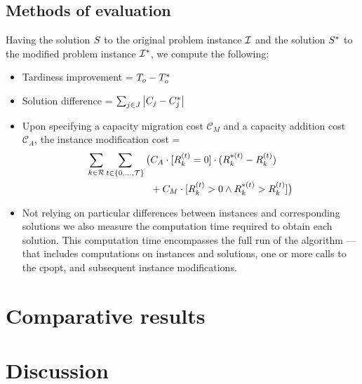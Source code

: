 \subsection{Methods of evaluation} \label{subsec:numerical-experiments/setup/methods-of-evaluation}

Having the solution $S$ to the original problem instance $\mathcal{I}$
and the solution $S^*$ to the modified problem instance $\mathcal{I}^*$,
we compute the following:
\begin{itemize}
    \item Tardiness improvement = $T_{o} - T_{o}^*$
    \item Solution difference = $\sum_{j \in J} \left|{C_{j} - C_{j}^*}\right|$
    \item Upon specifying a capacity migration cost $\mathcal{C}_M$ and a capacity addition cost $\mathcal{C}_A$,
        the instance modification cost =
        \begin{align*}
            \sum_{k \in \Resources} \sum_{t \in \intinterval{0}{\horizon}}
            \big( &C_A \cdot [\capacity{k}{t} = 0] \cdot (\capacity{k}{t}^* - \capacity{k}{t} ) \\
            &+ C_M \cdot [\capacity{k}{t} > 0 \land \capacity{k}{t}^* > \capacity{k}{t}] \big)
        \end{align*}
    \item Not relying on particular differences between instances and corresponding solutions
        we also measure the computation time required to obtain each solution.
        This computation time encompasses the full run of the algorithm
        --- that includes computations on instances and solutions,
        one or more calls to the \ac{cpopt},
        and subsequent instance modifications.
\end{itemize}


\section{Comparative results} \label{sec:numerical-experiments/comparative-results}

\section{Discussion} \label{sec:numerical-experiments/discussion}
